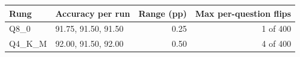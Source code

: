 \begin{tabular}{@{}llrr@{}}
\toprule
Rung & Accuracy per run & Range (pp) & Max per-question flips \\
\midrule
Q8\_0 & 91.75, 91.50, 91.50 & 0.25 & 1 of 400 \\
Q4\_K\_M & 92.00, 91.50, 92.00 & 0.50 & 4 of 400 \\
\bottomrule
\end{tabular}
